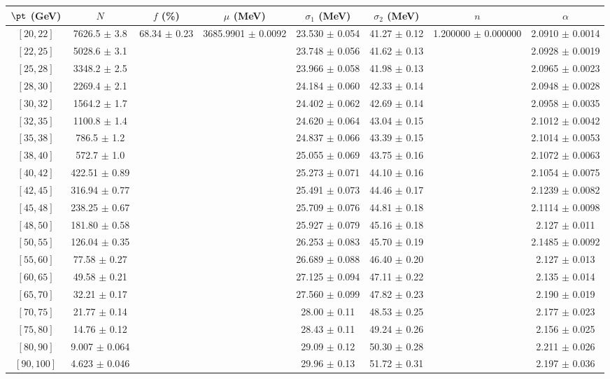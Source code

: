 \begin{tabular}{c||c|c|c|c|c|c|c}
$\pt$ (GeV) & $N$ & $f$ (\%) & $\mu$ (MeV) & $\sigma_1$ (MeV) & $\sigma_2$ (MeV) & $n$ & $\alpha$ \\
\hline
$[20, 22]$ & 7626.5 $\pm$ 3.8 & \multirow{20}{*}{68.34 $\pm$ 0.23} & \multirow{20}{*}{3685.9901 $\pm$ 0.0092} & 23.530 $\pm$ 0.054 & 41.27 $\pm$ 0.12 & \multirow{20}{*}{1.200000 $\pm$ 0.000000} & 2.0910 $\pm$ 0.0014\\
$[22, 25]$ & 5028.6 $\pm$ 3.1 &  &  & 23.748 $\pm$ 0.056 & 41.62 $\pm$ 0.13 &  & 2.0928 $\pm$ 0.0019\\
$[25, 28]$ & 3348.2 $\pm$ 2.5 &  &  & 23.966 $\pm$ 0.058 & 41.98 $\pm$ 0.13 &  & 2.0965 $\pm$ 0.0023\\
$[28, 30]$ & 2269.4 $\pm$ 2.1 &  &  & 24.184 $\pm$ 0.060 & 42.33 $\pm$ 0.14 &  & 2.0948 $\pm$ 0.0028\\
$[30, 32]$ & 1564.2 $\pm$ 1.7 &  &  & 24.402 $\pm$ 0.062 & 42.69 $\pm$ 0.14 &  & 2.0958 $\pm$ 0.0035\\
$[32, 35]$ & 1100.8 $\pm$ 1.4 &  &  & 24.620 $\pm$ 0.064 & 43.04 $\pm$ 0.15 &  & 2.1012 $\pm$ 0.0042\\
$[35, 38]$ & 786.5 $\pm$ 1.2 &  &  & 24.837 $\pm$ 0.066 & 43.39 $\pm$ 0.15 &  & 2.1014 $\pm$ 0.0053\\
$[38, 40]$ & 572.7 $\pm$ 1.0 &  &  & 25.055 $\pm$ 0.069 & 43.75 $\pm$ 0.16 &  & 2.1072 $\pm$ 0.0063\\
$[40, 42]$ & 422.51 $\pm$ 0.89 &  &  & 25.273 $\pm$ 0.071 & 44.10 $\pm$ 0.16 &  & 2.1054 $\pm$ 0.0075\\
$[42, 45]$ & 316.94 $\pm$ 0.77 &  &  & 25.491 $\pm$ 0.073 & 44.46 $\pm$ 0.17 &  & 2.1239 $\pm$ 0.0082\\
$[45, 48]$ & 238.25 $\pm$ 0.67 &  &  & 25.709 $\pm$ 0.076 & 44.81 $\pm$ 0.18 &  & 2.1114 $\pm$ 0.0098\\
$[48, 50]$ & 181.80 $\pm$ 0.58 &  &  & 25.927 $\pm$ 0.079 & 45.16 $\pm$ 0.18 &  & 2.127 $\pm$ 0.011\\
$[50, 55]$ & 126.04 $\pm$ 0.35 &  &  & 26.253 $\pm$ 0.083 & 45.70 $\pm$ 0.19 &  & 2.1485 $\pm$ 0.0092\\
$[55, 60]$ & 77.58 $\pm$ 0.27 &  &  & 26.689 $\pm$ 0.088 & 46.40 $\pm$ 0.20 &  & 2.127 $\pm$ 0.013\\
$[60, 65]$ & 49.58 $\pm$ 0.21 &  &  & 27.125 $\pm$ 0.094 & 47.11 $\pm$ 0.22 &  & 2.135 $\pm$ 0.014\\
$[65, 70]$ & 32.21 $\pm$ 0.17 &  &  & 27.560 $\pm$ 0.099 & 47.82 $\pm$ 0.23 &  & 2.190 $\pm$ 0.019\\
$[70, 75]$ & 21.77 $\pm$ 0.14 &  &  & 28.00 $\pm$ 0.11 & 48.53 $\pm$ 0.25 &  & 2.177 $\pm$ 0.023\\
$[75, 80]$ & 14.76 $\pm$ 0.12 &  &  & 28.43 $\pm$ 0.11 & 49.24 $\pm$ 0.26 &  & 2.156 $\pm$ 0.025\\
$[80, 90]$ & 9.007 $\pm$ 0.064 &  &  & 29.09 $\pm$ 0.12 & 50.30 $\pm$ 0.28 &  & 2.211 $\pm$ 0.026\\
$[90, 100]$ & 4.623 $\pm$ 0.046 &  &  & 29.96 $\pm$ 0.13 & 51.72 $\pm$ 0.31 &  & 2.197 $\pm$ 0.036\\
\end{tabular}
